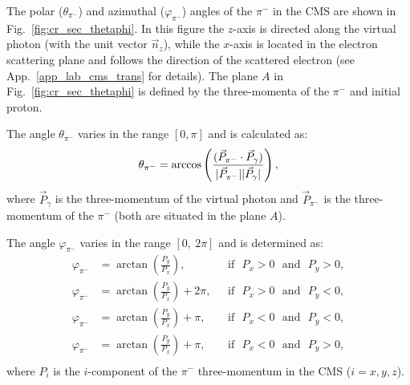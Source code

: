 The polar ($\theta_{\pi^{-}}$) and azimuthal ($\varphi_{\pi^{-}}$) angles of the $\pi^{-}$ in the CMS are shown in Fig.~\ref{fig:cr_sec_thetaphi}. In this figure the $z$-axis is directed along the virtual photon (with the unit vector $\vec n_{z}$), while the $x$-axis is located in the electron scattering plane and follows the direction of the scattered electron (see App.~\ref{app_lab_cms_trans} for details). The plane $A$ in Fig.~\ref{fig:cr_sec_thetaphi} is defined by the three-momenta of the $\pi^{-}$ and initial proton.  
	
The angle $\theta_{\pi^{-}}$ varies in the range $[0,\pi]$ and is calculated as:\vspace{-0.25em}
\begin{equation}
\theta_{\pi^{-}} = \arccos\left( \frac{(\vec P_{\pi^{-}} \cdot \vec P_{\gamma})}
{|\vec P_{\pi^{-}}| |\vec P_{\gamma}|} \right),\\[-5pt]
\label{angletheta}
\end{equation} 
where $\vec P_{\gamma}$ is the three-momentum of the virtual photon and $\vec P_{\pi^{-}}$ is the three-momentum of the  $\pi^{-}$ (both are situated in the plane $A$).

The angle $\varphi_{\pi^{-}}$ varies in the range $[0,~2\pi]$ and is determined as:\vspace{-0.25em}
\begin{equation}
\begin{aligned}
\varphi_{\pi^{-}} &= \arctan\left( \frac{P_{y}}{P_{x}} \right), &\text{~~if~~} P_{x} > 0 \text{~~and~~}  P_{y} > 0, \\
\varphi_{\pi^{-}} &= \arctan\left( \frac{P_{y}}{P_{x}} \right) + 2\pi, &\text{~~if~~}P_{x} > 0 \text{~~and~~}  P_{y} < 0, \\
\varphi_{\pi^{-}} &= \arctan\left( \frac{P_{y}}{P_{x}} \right) + \pi, &\text{~~if~~}P_{x} < 0 \text{~~and~~}  P_{y} < 0, \\
\varphi_{\pi^{-}} &= \arctan\left( \frac{P_{y}}{P_{x}} \right) + \pi, &\text{~~if~~}P_{x} < 0 \text{~~and~~}  P_{y} > 0,  \\
\end{aligned}
\end{equation}
where $P_{i}$ is the $i$-component of the $\pi^{-}$ three-momentum in the CMS ($i = x,y,z$).

